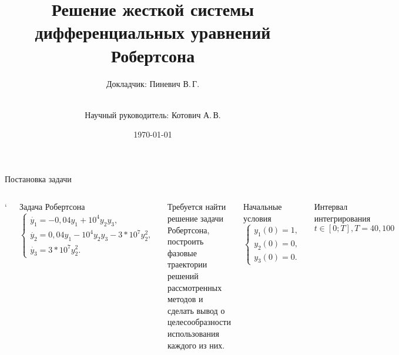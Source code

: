 \documentclass[ignoreonframetext,unicode]{beamer}
\title[Решение задачи Робертсона]{Решение жесткой системы\\ дифференциальных уравнений Робертсона}
\author[Пиневич В.\,Г.]{Докладчик: Пиневич В.\,Г.\and\\[0.5mm] Научный руководитель: Котович А.\,В.}
\institute[каф. Прикладная математика ФН-2]{группа ФН2-61Б}
\date{\today}
\begin{document}
	
	\begin{frame}[plain]
		\maketitle
	\end{frame}

	\begin{frame}{Постановка задачи}
		\begin{columns}
			\column{\textwidth}`
			\begin{block}{Задача Робертсона}
			 \[
				\begin{cases}
					\dot{y_1} = -0,04 y_1 + 10^4 y_2 y_3,\\
					\dot{y_2} = 0,04 y_1 - 10^4 y_2 y_3 - 3 * 10^7 y_2^2,\\
					\dot{y_3} = 3 * 10^7 y_2^2.
				\end{cases}
			 \]
			\end{block}

		\begin{columns}
			Требуется найти решение задачи Робертсона, построить фазовые траектории решений рассмотренных методов и сделать вывод о целесообразности использования каждого из них.
			\begin{block}{Начальные условия}
				\[
				\begin{cases}
					y_1(0) = 1,\\
					y_2(0) = 0,\\
					y_3(0) = 0.
				\end{cases}
				\]
			\end{block}
		\begin{block}{Интервал интегрирования}
		\[
			t \in [0; T], T = 40, 100
		\]
		\end{block}
		\end{columns}

		\end{columns}
		
	\end{frame}
\end{document}
